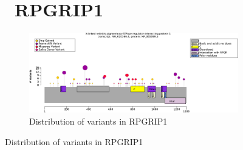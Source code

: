 \begin{figure}[htbp]
\section*{ RPGRIP1}
\centering
\begin{subfigure}[b]{0.95\textwidth}
\centering
\includegraphics[width=\textwidth]{ img/RPGRIP1_protein_diagram.pdf} 
\captionsetup{justification=raggedright,singlelinecheck=false}
\caption{Distribution of variants in RPGRIP1}
\end{subfigure}

\vspace{1em}


\end{figure}
